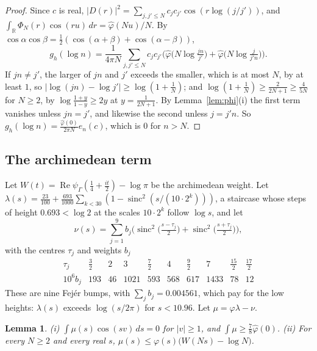 \documentclass[11pt]{article}
\newtheorem{lemma}[theorem]{Lemma}
\theoremstyle{definition}
\newcommand{\sinc}{\operatorname{sinc}}
\begin{document}
\begin{proof}
Since $c$ is real, $|D(r)|^2 = \sum_{j, j' \le N} c_j c_{j'} \cos(r \log(j/j'))$, and $\int_{\mathbb R} \Phi_N(r)
\cos(ru)\,dr = \hat\varphi(Nu)/N$. By $\cos\alpha \cos\beta = \frac12(\cos(\alpha + \beta) + \cos(\alpha - \beta))$,
\[
g_h(\log n) = \frac{1}{4\pi N} \sum_{j, j' \le N} c_j c_{j'} \Big(\hat\varphi\big(N \log\tfrac{jn}{j'}\big) +
\hat\varphi\big(N \log\tfrac{j}{j'n}\big)\Big).
\]
If $jn \ne j'$, the larger of $jn$ and $j'$ exceeds the smaller, which is at most $N$, by at least $1$, so $|\log(jn) -
\log j'| \ge \log(1 + \frac1N)$; and $\log(1 + \frac1N) \ge \frac{2}{2N + 1} \ge \frac{4}{5N}$ for $N \ge 2$, by
$\log\frac{1 + y}{1 - y} \ge 2y$ at $y = \frac{1}{2N + 1}$. By Lemma~\ref{lem:phi}(i) the first term vanishes unless $jn
= j'$, and likewise the second unless $j = j'n$. So $g_h(\log n) = \frac{\hat\varphi(0)}{2\pi N} e_n(c)$, which is $0$
for $n > N$.
\end{proof}

\subsection{The archimedean term}

Let $W(t) = \operatorname{Re} \psi_\Gamma(\frac14 + \frac{it}2) - \log \pi$ be the archimedean weight. Let $\lambda(s) =
\frac{23}{100} + \frac{693}{1000} \sum_{k < 30} (1 - \sinc^2(s/(10 \cdot 2^k)))$, a staircase whose steps of height
$0.693 < \log 2$ at the scales $10 \cdot 2^k$ follow $\log s$, and let
\[
\nu(s) = \sum_{j = 1}^{9} b_j \Big(\sinc^2\big(\tfrac{s - \tau_j}{2}\big) + \sinc^2\big(\tfrac{s + \tau_j}{2}\big)\Big),
\]
with the centres $\tau_j$ and weights $b_j$
\[
\begin{array}{c|ccccccccc}
\tau_j & \frac32 & 2 & 3 & \frac72 & 4 & \frac92 & 7 & \frac{15}{2} & \frac{17}{2} \\[2pt] \hline
10^6 b_j & 193 & 46 & 1021 & 593 & 568 & 617 & 1433 & 78 & 12
\end{array}
\]
These are nine Fejér bumps, with $\sum_j b_j = 0.004561$, which pay for the low heights: $\lambda(s)$ exceeds
$\log(s/2\pi)$ for $s < 10.96$. Let $\mu = \varphi\lambda - \nu$.

\begin{lemma}\label{lem:minorant}
\textup{(i)} $\int \mu(s) \cos(sv)\,ds = 0$ for $|v| \ge 1$, and $\int \mu \ge \frac78 \hat\varphi(0)$.
\textup{(ii)} For every $N \ge 2$ and every real $s$, $\mu(s) \le \varphi(s)\big(W(Ns) - \log N\big)$.
\end{lemma}
\end{document}
